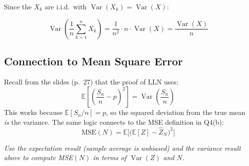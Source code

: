 \documentclass[11pt]{article}
\newcommand{\Var}{\operatorname{Var}}
\newcommand{\E}{\mathbb{E}}
\begin{document}
Since the $X_k$ are i.i.d.\ with $\Var(X_k) = \Var(X)$:

\begin{tcolorbox}[colback=orange!5, colframe=orange!50!black, title=Variance of the Sample Average]
\[
\Var\!\left(\frac{1}{n}\sum_{k=1}^n X_k\right) = \frac{1}{n^2}\cdot n\cdot \Var(X) = \frac{\Var(X)}{n}
\]
\end{tcolorbox}

\subsection*{Connection to Mean Square Error}

Recall from the slides (p.\ 27) that the proof of LLN uses:
\[
\E\!\left[\left(\frac{S_n}{n} - p\right)^{\!2}\right] = \Var\!\left(\frac{S_n}{n}\right)
\]
This works because $\E[S_n/n] = p$, so the squared deviation from the true mean \emph{is} the variance. The same logic connects to the MSE definition in Q4(b):
\[
\text{MSE}(N) = \E\!\Big[\big(\E[Z] - \hat{Z}_N\big)^2\Big]
\]

\bigskip
\noindent\textit{Use the expectation result (sample average is unbiased) and the variance result above to compute MSE$(N)$ in terms of $\Var(Z)$ and $N$.}
\end{document}

